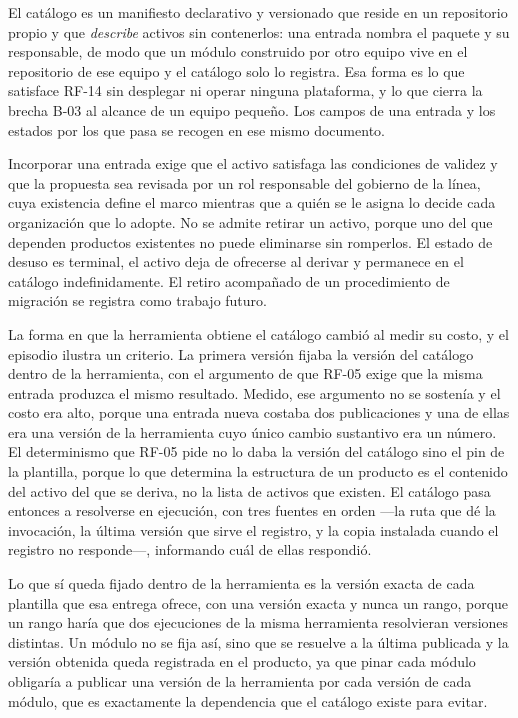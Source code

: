 El catálogo es un manifiesto declarativo y versionado que reside en un
repositorio propio y que \emph{describe} activos sin contenerlos: una entrada
nombra el paquete y su responsable, de modo que un módulo construido por otro
equipo vive en el repositorio de ese equipo y el catálogo solo lo registra.
Esa forma es lo que satisface RF-14 sin desplegar ni operar ninguna
plataforma, y lo que cierra la brecha B-03 al alcance de un equipo pequeño.
Los campos de una entrada y los estados por los que pasa se recogen en ese
mismo documento.

Incorporar una entrada exige que el activo satisfaga las condiciones de
validez y que la propuesta sea revisada por un rol responsable del gobierno
de la línea, cuya existencia define el marco mientras que a quién se le
asigna lo decide cada organización que lo adopte. No se admite retirar un
activo, porque uno del que dependen productos existentes no puede eliminarse
sin romperlos. El estado de desuso es terminal, el activo deja de ofrecerse al
derivar y permanece en el catálogo indefinidamente. El retiro acompañado
de un procedimiento de migración se registra como trabajo futuro.

La forma en que la herramienta obtiene el catálogo cambió al medir su costo, y
el episodio ilustra un criterio. La primera versión fijaba la versión del
catálogo dentro de la herramienta, con el argumento de que RF-05 exige que la
misma entrada produzca el mismo resultado. Medido, ese argumento no se
sostenía y el costo era alto, porque una entrada nueva costaba dos
publicaciones y una de ellas era una versión de la herramienta cuyo único
cambio sustantivo era un número. El determinismo que RF-05 pide no lo daba la
versión del catálogo sino el pin de la plantilla, porque lo que determina la
estructura de un producto es el contenido del activo del que se deriva, no la
lista de activos que existen. El catálogo pasa entonces a resolverse en
ejecución, con tres fuentes en orden —la ruta que dé la invocación, la última
versión que sirve el registro, y la copia instalada cuando el registro no
responde—, informando cuál de ellas respondió.

Lo que sí queda fijado dentro de la herramienta es la versión exacta de cada
plantilla que esa entrega ofrece, con una versión exacta y nunca un rango,
porque un rango haría que dos ejecuciones de la misma herramienta resolvieran
versiones distintas. Un módulo no se fija así, sino que se resuelve a la
última publicada y la versión obtenida queda registrada en el producto, ya
que pinar cada módulo obligaría a publicar una versión de la herramienta por
cada versión de cada módulo, que es exactamente la dependencia que el
catálogo existe para evitar.

